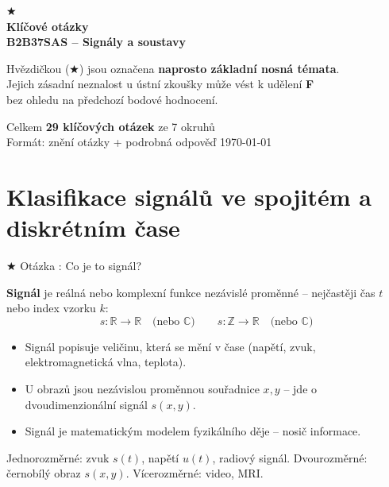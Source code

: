 \documentclass[12pt,a4paper]{article}
\newcounter{otcnt}
\newcommand{\QA}[2]{%
  \stepcounter{otcnt}%
  \begin{Otazka}{}%
    $\bigstar$ Otázka \theotcnt: #1%
  \end{Otazka}%
  \begin{Odpoved}%
    #2%
  \end{Odpoved}%
  \vspace{1em}%
}
\begin{document}
\begin{titlepage}
  \centering
  \vspace*{2cm}
  {\fontsize{40}{48}\selectfont\bfseries\color{cervena}$\bigstar$}\\[0.5cm]
  {\Huge\bfseries\color{tmavemodr} Klíčové otázky\\[0.3em]
   \large B2B37SAS – Signály a soustavy}\\[1.2cm]
  \begin{tcolorbox}[colback=cervena!10,colframe=cervena,width=0.88\linewidth,
                    left=10pt,right=10pt,top=8pt,bottom=8pt]
    \centering\normalsize
    Hvězdičkou ($\bigstar$) jsou označena \textbf{naprosto základní nosná témata}.\\[4pt]
    Jejich zásadní neznalost u ústní zkoušky může vést k udělení \textbf{F}\\
    bez ohledu na předchozí bodové hodnocení.
  \end{tcolorbox}
  \vspace{0.8cm}
  {\large Celkem \textbf{29 klíčových otázek} ze 7 okruhů}\\[0.3cm]
  {\normalsize Formát: znění otázky + podrobná odpověď}
  \vfill
  {\large\today}
\end{titlepage}

\tableofcontents
\newpage

\section{Klasifikace signálů ve spojitém a diskrétním čase}

\QA{Co je to signál?}{%
  \textbf{Signál} je reálná nebo komplexní funkce nezávislé proměnné – nejčastěji čas $t$ nebo index vzorku $k$:
  \[
    s: \mathbb{R} \to \mathbb{R} \quad \text{(nebo } \mathbb{C}\text{)}
    \qquad
    s: \mathbb{Z} \to \mathbb{R} \quad \text{(nebo } \mathbb{C}\text{)}
  \]
  \begin{itemize}[itemsep=3pt]
    \item Signál popisuje veličinu, která se mění v čase (napětí, zvuk, elektromagnetická vlna, teplota).
    \item U obrazů jsou nezávislou proměnnou souřadnice $x, y$ – jde o dvoudimenzionální signál $s(x,y)$.
    \item Signál je matematickým modelem fyzikálního děje – nosič informace.
  \end{itemize}
  \begin{Poznamka}[Příklady]
    Jednorozměrné: zvuk $s(t)$, napětí $u(t)$, radiový signál. Dvourozměrné: černobílý obraz $s(x,y)$. Vícerozměrné: video, MRI.
  \end{Poznamka}
}
\end{document}
